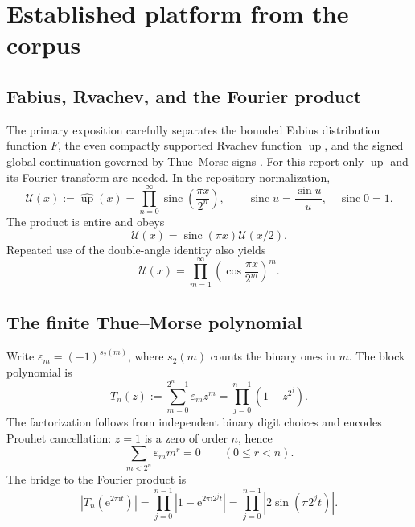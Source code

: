 \documentclass[11pt,oneside]{article}
\theoremstyle{definition}
\theoremstyle{remark}
\newcommand{\Up}{\operatorname{up}}
\newcommand{\sinc}{\operatorname{sinc}}
\newcommand{\e}{\mathrm e}
\newcommand{\ii}{\mathrm i}
\newcommand{\eps}{\varepsilon}
\newcommand{\wt}{s_2}
\begin{document}
\section{Established platform from the corpus}\label{p2:sec:platform}

\subsection{Fabius, Rvachev, and the Fourier product}

The primary exposition carefully separates the bounded Fabius distribution
function $F$, the even compactly supported Rvachev function $\Up$, and the signed
global continuation governed by Thue--Morse signs \cite{p2:proveit,p2:ariascompact,p2:ariasarith}.
For this report only $\Up$ and its Fourier transform are needed. In the repository
normalization,
\begin{equation}
 \mathscr U(x):=\widehat{\Up}(x)
 =\prod_{n=0}^{\infty}\sinc\!\left(\frac{\pi x}{2^n}\right),
 \qquad \sinc u=\frac{\sin u}{u},\quad\sinc0=1.
 \label{p2:eq:U-product}
\end{equation}
The product is entire and obeys
\begin{equation}
 \mathscr U(x)=\sinc(\pi x)\mathscr U(x/2).
 \label{p2:eq:U-refine}
\end{equation}
Repeated use of the double-angle identity also yields
\begin{equation}
 \mathscr U(x)=\prod_{m=1}^{\infty}\left(\cos\frac{\pi x}{2^m}\right)^m.
 \label{p2:eq:U-cos}
\end{equation}

\subsection{The finite Thue--Morse polynomial}

Write $\eps_m=(-1)^{\wt(m)}$, where $\wt(m)$ counts the binary ones in $m$. The
block polynomial is
\begin{equation}
 T_n(z):=\sum_{m=0}^{2^n-1}\eps_mz^m
       =\prod_{j=0}^{n-1}(1-z^{2^j}).
 \label{p2:eq:TM-poly}
\end{equation}
The factorization follows from independent binary digit choices and encodes Prouhet
cancellation: $z=1$ is a zero of order $n$, hence
\[
 \sum_{m<2^n}\eps_mm^r=0\qquad(0\le r<n).
\]
The bridge to the Fourier product is
\begin{equation}
 |T_n(\e^{2\pi\ii t})|
 =\prod_{j=0}^{n-1}|1-\e^{2\pi\ii2^jt}|
 =\prod_{j=0}^{n-1}|2\sin(\pi2^jt)|.
 \label{p2:eq:T-Q}
\end{equation}
\end{document}
